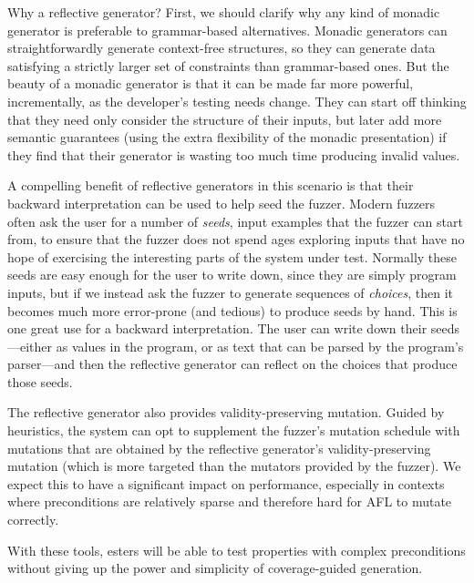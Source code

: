 Why a reflective generator? First, we should clarify why any kind of monadic
generator is preferable to grammar-based alternatives. Monadic generators can
straightforwardly generate context-free structures, so they can generate data
satisfying a strictly larger set of constraints than grammar-based ones.
But the beauty of a monadic
generator is that it can be made far more powerful, incrementally, as the
developer's testing needs change. They can start off thinking that they
need only consider the structure of their inputs, but later add more
semantic guarantees (using the extra flexibility of the monadic
presentation) if they find that their generator is wasting too much time
producing invalid values.

A compelling benefit of reflective generators in this scenario is that
their backward interpretation can be used to help seed the fuzzer.
Modern fuzzers often
ask the user for a number of {\em seeds}, input examples that the fuzzer can start from,
to ensure that the fuzzer does not spend ages exploring
inputs that have no hope of exercising the interesting parts of the
system under test. Normally these seeds are easy enough
for the user to write down, since they are simply program inputs, but if
we instead ask the fuzzer to generate sequences of {\em choices}, then
it becomes much more
error-prone (and tedious) to produce seeds by hand.  This is one great use for a
backward interpretation. The user can write down their seeds---either as values
in the program, or as text that can be parsed by the program's parser---and then
the reflective generator can reflect on the choices that produce those seeds.

The reflective generator also provides validity-preserving mutation. Guided by
heuristics, the system can opt to supplement the fuzzer's mutation schedule with
mutations that are obtained by the reflective generator's validity-preserving
mutation (which is more targeted than the mutators provided by the fuzzer). We
expect this to have a significant impact on performance, especially in contexts
where preconditions are relatively sparse and therefore hard for AFL to mutate
correctly.

With these tools, esters will be able to test properties with complex preconditions
without giving up the power and simplicity of coverage-guided generation.


